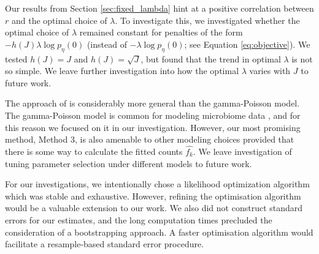 \documentclass[oupdraft]{bio}
\newcommand{\lambdagrid}{\lambda^{\text{grid}}}
\begin{document}
Our results from Section \ref{sec:fixed_lambda} hint at a positive correlation between $r$ and the optimal choice of $\lambda$. To investigate this, we investigated whether the optimal choice of $\lambda$ remained constant for penalties of the form $-h(J)\lambda \log p_{\eta}(0)$ (instead of $-\lambda \log p_{\eta}(0)$; see Equation \eqref{eq:objective}).
We tested $h(J) = J$ and $h(J) = \sqrt{J}$, but found that the trend in optimal $\lambda$ is not so simple. We leave further investigation into how the optimal $\lambda$ varies with $J$ to future work.

The approach of \citet{wang_2005} is considerably more general than the gamma-Poisson model.  The gamma-Poisson model is common for modeling microbiome data \citep{deseq2,mcmurdie2013phyloseq}, and for this reason we focused on it in our investigation. However, our most promising method, Method 3, is also amenable to other modeling choices provided that there is some way to calculate the fitted counts $\widehat{f_k}$. We leave investigation of tuning parameter selection under different models to future work.

For our investigations, we intentionally chose a likelihood optimization algorithm which was stable and exhaustive. However, refining the optimisation algorithm would be a valuable extension to our work. We also did not construct standard errors for our estimates, and the long computation times precluded the consideration of a bootstrapping approach.  A faster optimisation algorithm would facilitate a resample-based standard error procedure.


\end{document}
